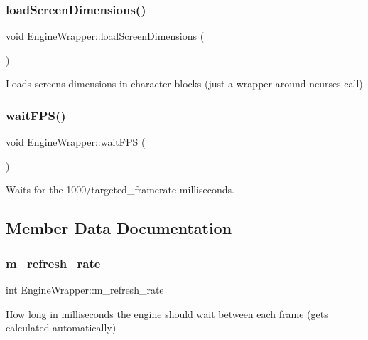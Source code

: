\subsubsection{\texorpdfstring{load\+Screen\+Dimensions()}{loadScreenDimensions()}}
{\footnotesize\ttfamily void Engine\+Wrapper\+::load\+Screen\+Dimensions (\begin{DoxyParamCaption}{ }\end{DoxyParamCaption})}



Loads screen\textquotesingle{}s dimensions in character blocks (just a wrapper around ncurses call) 

\mbox{\label{classEngineWrapper_a3e56de98238ab684cec60aaa556e1e40}} 
\subsubsection{\texorpdfstring{wait\+F\+P\+S()}{waitFPS()}}
{\footnotesize\ttfamily void Engine\+Wrapper\+::wait\+F\+PS (\begin{DoxyParamCaption}{ }\end{DoxyParamCaption})}



Waits for the 1000/targeted\+\_\+framerate milliseconds. 



\subsection{Member Data Documentation}
\mbox{\label{classEngineWrapper_a4a5092ca1f1008be1c49867fc0abd3c8}} 
\subsubsection{\texorpdfstring{m\+\_\+refresh\+\_\+rate}{m\_refresh\_rate}}
{\footnotesize\ttfamily int Engine\+Wrapper\+::m\+\_\+refresh\+\_\+rate\hspace{0.3cm}{\ttfamily [private]}}



How long in milliseconds the engine should wait between each frame (gets calculated automatically) 

